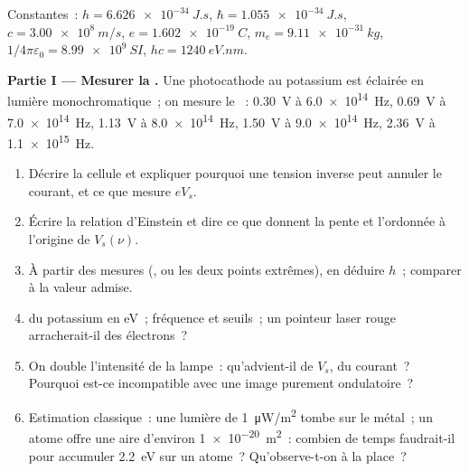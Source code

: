 \begin{problem}
\label{pb:b1:quantum-introduction:1}
Constantes~: $h = \qty{6.626e-34}{J.s}$, $\hbar = \qty{1.055e-34}{J.s}$, $c =
\qty{3.00e8}{m/s}$, $e = \qty{1.602e-19}{C}$, $m_e = \qty{9.11e-31}{kg}$,
$1/4\pi\varepsilon_0 = \qty{8.99e9}{SI}$, $hc = \qty{1240}{eV.nm}$.

\medskip
\noindent\textbf{Partie I --- Mesurer la .}
Une photocathode au potassium est éclairée en lumière monochromatique~; on
mesure le ~: \qty{0.30}{V} à \qty{6.0e14}{Hz}, \qty{0.69}{V} à
\qty{7.0e14}{Hz}, \qty{1.13}{V} à \qty{8.0e14}{Hz}, \qty{1.50}{V} à
\qty{9.0e14}{Hz}, \qty{2.36}{V} à \qty{1.1e15}{Hz}.
\begin{enumerate}
  \item Décrire la cellule et expliquer pourquoi une tension inverse peut
        annuler le courant, et ce que mesure $eV_s$.
  \item Écrire la relation d'Einstein et dire ce que donnent la pente et
        l'ordonnée à l'origine de $V_s(\nu)$.
  \item À partir des mesures (, ou les deux points
        extrêmes), en déduire $h$~; comparer à la valeur admise.
  \item {} du potassium en eV~; fréquence et  seuils~; un pointeur laser rouge arracherait-il des
        électrons~?
  \item On double l'intensité de la lampe~: qu'advient-il de $V_s$, du
        courant~? Pourquoi est-ce incompatible avec une image purement
        ondulatoire~?
  \item Estimation classique~: une lumière de \qty{1}{\micro W/m^2} tombe sur
        le métal~; un atome offre une aire d'environ \qty{1e-20}{m^2}~:
        combien de temps faudrait-il pour accumuler \qty{2.2}{eV} sur un
        atome~? Qu'observe-t-on à la place~?
\end{enumerate}


\end{problem}
